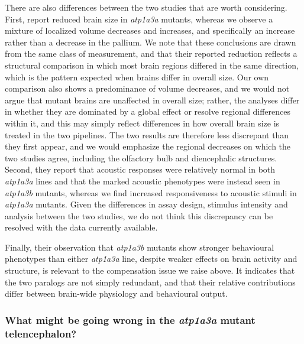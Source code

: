 \documentclass[9.5pt,lineno]{RandlettLab_elife}
\begin{document}
There are also differences between the two studies that are worth considering.
First, \citet{Moyer2026} report reduced brain size in \emph{atp1a3a} mutants, whereas we observe a mixture of localized volume decreases and increases, and specifically an increase rather than a decrease in the pallium.
We note that these conclusions are drawn from the same class of measurement, and that their reported reduction reflects a structural comparison in which most brain regions differed in the same direction, which is the pattern expected when brains differ in overall size.
Our own comparison also shows a predominance of volume decreases, and we would not argue that mutant brains are unaffected in overall size; rather, the analyses differ in whether they are dominated by a global effect or resolve regional differences within it, and this may simply reflect differences in how overall brain size is treated in the two pipelines.
The two results are therefore less discrepant than they first appear, and we would emphasize the regional decreases on which the two studies agree, including the olfactory bulb and diencephalic structures.
Second, they report that acoustic responses were relatively normal in both \emph{atp1a3a} lines and that the marked acoustic phenotypes were instead seen in \emph{atp1a3b} mutants, whereas we find increased responsiveness to acoustic stimuli in \emph{atp1a3a} mutants.
Given the differences in assay design, stimulus intensity and analysis between the two studies, we do not think this discrepancy can be resolved with the data currently available.

Finally, their observation that \emph{atp1a3b} mutants show stronger behavioural phenotypes than either \emph{atp1a3a} line, despite weaker effects on brain activity and structure, is relevant to the compensation issue we raise above.
It indicates that the two paralogs are not simply redundant, and that their relative contributions differ between brain-wide physiology and behavioural output.

\subsubsection{What might be going wrong in the \emph{atp1a3a} mutant telencephalon?}
\end{document}
